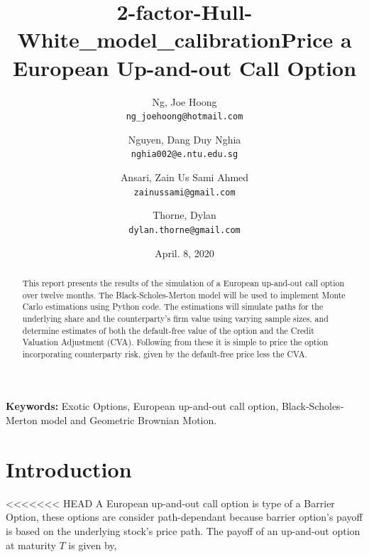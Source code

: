 \documentclass[11pt]{article}
\title{2-factor-Hull-White\_model\_calibration}
\begin{document}
\nocite{*} %

\title{Price a European Up-and-out Call Option}

\author{
  Ng, Joe Hoong\\
  \texttt{ng\_joehoong@hotmail.com}
  \and
  Nguyen, Dang Duy Nghia \\
  \texttt{nghia002@e.ntu.edu.sg}
   \and
  Ansari, Zain Us Sami Ahmed \\
  \texttt{zainussami@gmail.com}  
   \and
   Thorne, Dylan \\
  \texttt{dylan.thorne@gmail.com}  
  }

\date{April. 8, 2020} %
\maketitle

\noindent
\textbf{Keywords:} Exotic Options, European up-and-out call option,  Black-Scholes-Merton model and Geometric Brownian Motion.



\begin{abstract}
This report presents the results of the simulation of a European up-and-out call option over twelve months.  The Black-Scholes-Merton model will be used to implement Monte Carlo estimations using Python code. The estimations will simulate paths for the underlying share and the counterparty's firm value using varying sample sizes, and determine estimates of both the default-free value of the option and the Credit Valuation Adjustment (CVA). Following from these it is simple to price the option incorporating counterparty risk, given by the default-free price less the CVA.
\end{abstract}

\section{Introduction
}
<<<<<<< HEAD
A European up-and-out call option is type of a Barrier Option, these options are consider path-dependant because barrier option's payoff is based on the underlying stock's price path.  The payoff of an up-and-out option at maturity $T$ is given by,
\end{document}

